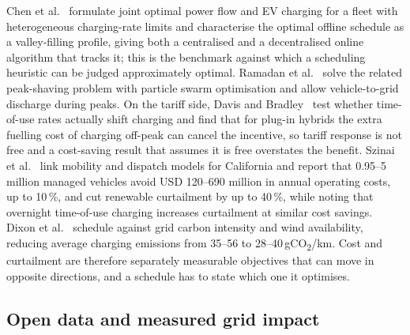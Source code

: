 \documentclass[10pt,a4paper]{article}
\begin{document}
Chen et al.~\cite{Chen2012ValleyFilling} formulate joint optimal power flow and EV charging for a
fleet with heterogeneous charging-rate limits and characterise the optimal offline schedule as a
valley-filling profile, giving both a centralised and a decentralised online algorithm that tracks
it; this is the benchmark against which a scheduling heuristic can be judged approximately optimal.
Ramadan et al.~\cite{Ramadan2018PeakShavingValleyFilling} solve the related peak-shaving problem
with particle swarm optimisation and allow vehicle-to-grid discharge during peaks. On the tariff
side, Davis and Bradley~\cite{Davis2012TOURatesEfficacy} test whether time-of-use rates actually
shift charging and find that for plug-in hybrids the extra fuelling cost of charging off-peak can
cancel the incentive, so tariff response is not free and a cost-saving result that assumes it is
free overstates the benefit. Szinai et al.~\cite{Szinai2020ReducedGridOperatingCosts} link mobility
and dispatch models for California and report that 0.95--5 million managed vehicles avoid
USD 120--690 million in annual operating costs, up to 10\,\%, and cut renewable curtailment by up
to 40\,\%, while noting that overnight time-of-use charging increases curtailment at similar cost
savings. Dixon et al.~\cite{Dixon2020MinimiseEmissionsWindCurtailment} schedule against grid carbon
intensity and wind availability, reducing average charging emissions from 35--56 to
28--40\,gCO\textsubscript{2}/km. Cost and curtailment are therefore separately measurable
objectives that can move in opposite directions, and a schedule has to state which one it
optimises.

\subsection{Open data and measured grid impact}
\end{document}
